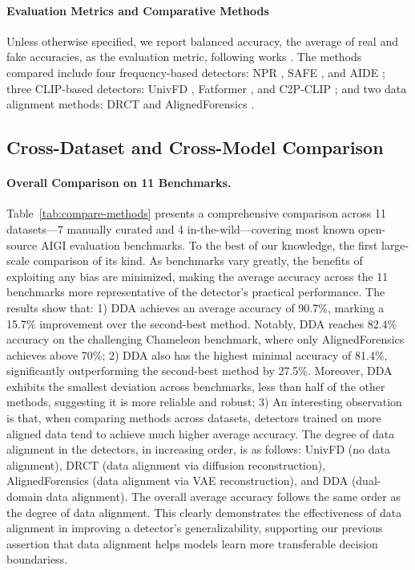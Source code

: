 \documentclass{article}
\begin{document}
\paragraph{Evaluation Metrics and Comparative Methods} Unless otherwise specified, we report balanced accuracy, the average of real and fake accuracies, as the evaluation metric, following works \cite{cozzolino2024zero, ojha2023towards, liu2024forgery, li2024improving, tan2024c2p, yan2024sanity, chen2024drct, rajan2025aligned, guillaro2024bias}. The methods compared include four frequency-based detectors: NPR \cite{cozzolino2024zero}, SAFE \cite{li2024improving}, and AIDE \cite{yan2024sanity}; three CLIP-based detectors: UnivFD \cite{ojha2023towards}, Fatformer \cite{liu2024forgery}, and C2P-CLIP \cite{tan2024c2p}; and two data alignment methods: DRCT \cite{chen2024drct} and AlignedForensics \cite{rajan2025aligned}.


\subsection{Cross-Dataset and Cross-Model Comparison}

\paragraph{Overall Comparison on 11 Benchmarks.}
Table~\ref{tab:compare-methods} presents a comprehensive comparison across 11 datasets—7 manually curated and 4 in-the-wild—covering most known open-source AIGI evaluation benchmarks. To the best of our knowledge, the first large-scale comparison of its kind. As benchmarks vary greatly, the benefits of exploiting any bias are minimized, making the average accuracy across the 11 benchmarks more representative of the detector's practical performance. The results show that: 1) DDA achieves an average accuracy of 90.7\%, marking a 15.7\% improvement over the second-best method. Notably, DDA reaches 82.4\% accuracy on the challenging Chameleon benchmark, where only AlignedForensics achieves above 70\%; 2) DDA also has the highest minimal accuracy of 81.4\%, significantly outperforming the second-best method by 27.5\%. Moreover, DDA exhibits the smallest deviation across benchmarks, less than half of the other methods, suggesting it is more reliable and robust; 3) An interesting observation is that, when comparing methods across datasets, detectors trained on more aligned data tend to achieve much higher average accuracy. The degree of data alignment in the detectors, in increasing order, is as follows: UnivFD (no data alignment), DRCT (data alignment via diffusion reconstruction), AlignedForensics (data alignment via VAE reconstruction), and DDA (dual-domain data alignment). The overall average accuracy follows the same order as the degree of data alignment. This clearly demonstrates the effectiveness of data alignment in improving a detector's generalizability, supporting our previous assertion that data alignment helps models learn more transferable decision boundariess.
\end{document}
